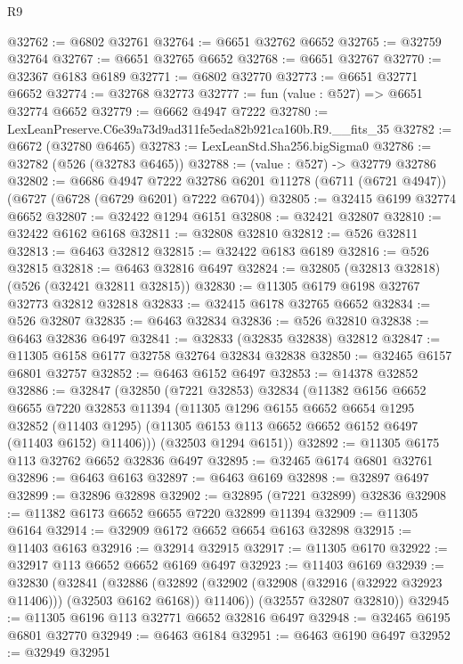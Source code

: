\begin{lexlean}{R9}
\begin{coremodule}
@32762 := @6802 @32761
@32764 := @6651 @32762 @6652
@32765 := @32759 @32764
@32767 := @6651 @32765 @6652
@32768 := @6651 @32767
@32770 := @32367 @6183 @6189
@32771 := @6802 @32770
@32773 := @6651 @32771 @6652
@32774 := @32768 @32773
@32777 := fun (value : @527) => @6651 @32774 @6652
@32779 := @6662 @4947 @7222
@32780 := LexLeanPreserve.C6e39a73d9ad311fe5eda82b921ca160b.R9.__fits_35
@32782 := @6672 (@32780 @6465)
@32783 := LexLeanStd.Sha256.bigSigma0
@32786 := @32782 (@526 (@32783 @6465))
@32788 := (value : @527) -> @32779 @32786
@32802 := @6686
    @4947
    @7222
    @32786
    @6201
    @11278
    (@6711 (@6721 @4947))
    (@6727 (@6728 (@6729 @6201) @7222 @6704))
@32805 := @32415 @6199 @32774 @6652
@32807 := @32422 @1294 @6151
@32808 := @32421 @32807
@32810 := @32422 @6162 @6168
@32811 := @32808 @32810
@32812 := @526 @32811
@32813 := @6463 @32812
@32815 := @32422 @6183 @6189
@32816 := @526 @32815
@32818 := @6463 @32816 @6497
@32824 := @32805 (@32813 @32818) (@526 (@32421 @32811 @32815))
@32830 := @11305 @6179 @6198 @32767 @32773 @32812 @32818
@32833 := @32415 @6178 @32765 @6652
@32834 := @526 @32807
@32835 := @6463 @32834
@32836 := @526 @32810
@32838 := @6463 @32836 @6497
@32841 := @32833 (@32835 @32838) @32812
@32847 := @11305 @6158 @6177 @32758 @32764 @32834 @32838
@32850 := @32465 @6157 @6801 @32757
@32852 := @6463 @6152 @6497
@32853 := @14378 @32852
@32886 := @32847
    (@32850
      (@7221 @32853)
      @32834
      (@11382
        @6156
        @6652
        @6655
        @7220
        @32853
        @11394
        (@11305
          @1296
          @6155
          @6652
          @6654
          @1295
          @32852
          (@11403 @1295)
          (@11305 @6153 @113 @6652 @6652 @6152 @6497 (@11403 @6152) @11406)))
      (@32503 @1294 @6151))
@32892 := @11305 @6175 @113 @32762 @6652 @32836 @6497
@32895 := @32465 @6174 @6801 @32761
@32896 := @6463 @6163
@32897 := @6463 @6169
@32898 := @32897 @6497
@32899 := @32896 @32898
@32902 := @32895 (@7221 @32899) @32836
@32908 := @11382 @6173 @6652 @6655 @7220 @32899 @11394
@32909 := @11305 @6164
@32914 := @32909 @6172 @6652 @6654 @6163 @32898
@32915 := @11403 @6163
@32916 := @32914 @32915
@32917 := @11305 @6170
@32922 := @32917 @113 @6652 @6652 @6169 @6497
@32923 := @11403 @6169
@32939 := @32830
    (@32841
      (@32886
        (@32892 (@32902 (@32908 (@32916 (@32922 @32923 @11406))) (@32503 @6162 @6168)) @11406))
      (@32557 @32807 @32810))
@32945 := @11305 @6196 @113 @32771 @6652 @32816 @6497
@32948 := @32465 @6195 @6801 @32770
@32949 := @6463 @6184
@32951 := @6463 @6190 @6497
@32952 := @32949 @32951

\end{coremodule}
\end{lexlean}
